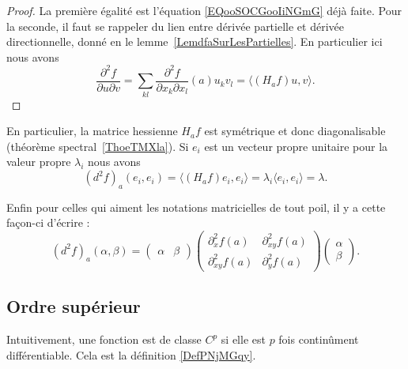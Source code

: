 \begin{proof}
    La première égalité est l'équation \eqref{EQooSOCGooIiNGmG} déjà faite. Pour la seconde, il faut se rappeler du lien entre dérivée partielle et dérivée directionnelle, donné en le lemme~\ref{LemdfaSurLesPartielles}. En particulier ici nous avons
    \begin{equation}
        \frac{ \partial^2f }{ \partial u\partial v }=\sum_{kl}\frac{ \partial^2f }{ \partial x_k\partial x_l  }(a)u_kv_l=\langle (H_af)u, v\rangle .
    \end{equation}
\end{proof}

En particulier, la matrice hessienne \( H_af\) est symétrique et donc diagonalisable (théorème spectral~\ref{ThoeTMXla}). Si \( e_i\) est un vecteur propre unitaire pour la valeur propre \( \lambda_i\) nous avons
\begin{equation}
    (d^2f)_a(e_i,e_i)=\langle (H_af)e_i, e_i\rangle =\lambda_i\langle e_i, e_i\rangle =\lambda.
\end{equation}

Enfin pour celles qui aiment les notations matricielles de tout poil, il y a cette façon-ci d'écrire :
\begin{equation}
    (d^2f)_a(\alpha,\beta)=\begin{pmatrix}
        \alpha    &   \beta
    \end{pmatrix}\begin{pmatrix}
        \partial^2_xf(a)    &   \partial^2_{xy}f(a)    \\
        \partial^2_{xy}f(a)    &   \partial^2_yf(a)
    \end{pmatrix}\begin{pmatrix}
        \alpha    \\
        \beta
    \end{pmatrix}.
\end{equation}

\subsection{Ordre supérieur}

Intuitivement, une fonction est de classe \( C^p\) si elle est \( p\) fois continûment différentiable. Cela est la définition \ref{DefPNjMGqy}.


